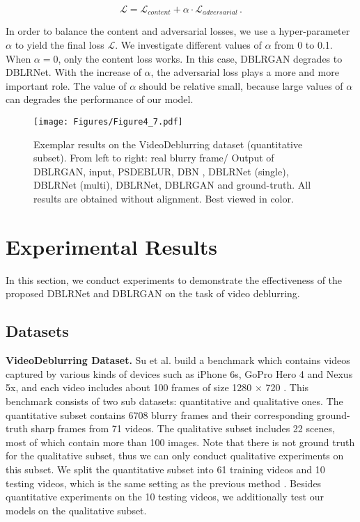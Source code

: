 \documentclass[journal]{IEEEtran}
\begin{document}
\begin{equation}
\mathcal{L} = \mathcal{L}_{content} + \alpha \cdot \mathcal{L}_{adversarial} \, .
\end{equation}

In order to balance the content and adversarial losses, we use a hyper-parameter  $\alpha$ to yield the final loss $\mathcal{L}$. We investigate different values of $\alpha$ from 0 to 0.1. When $\alpha=0$, only the content loss works. In this case, DBLRGAN degrades to DBLRNet. With the increase of $\alpha$, the adversarial loss plays a more and more important role. The value of $\alpha$ should be relative small, because large values of $\alpha$ can degrades the performance of our model.

\begin{figure*}[ht]
	\centering
	\texttt{[image: Figures/Figure4\_7.pdf]}
	\caption{Exemplar results on the VideoDeblurring dataset (quantitative subset). From left to right: real blurry frame/ Output of DBLRGAN, input, PSDEBLUR, DBN \cite{su2016deep}, DBLRNet (single), DBLRNet (multi), DBLRNet, DBLRGAN and ground-truth. All results are obtained without alignment. Best viewed in color.}
	\label{figure4}
\end{figure*}

\section{Experimental Results}
\noindent In this section, we conduct experiments to demonstrate the effectiveness of the proposed DBLRNet and DBLRGAN on the task of video deblurring.

\subsection{Datasets}

\textbf{VideoDeblurring Dataset.} Su et al. build a benchmark which contains videos captured by various kinds of devices such as iPhone 6s, GoPro Hero 4 and Nexus 5x, and each video includes about 100 frames of size 1280 $\times$ 720 \cite{su2016deep}. This benchmark consists of two sub datasets: quantitative and qualitative ones. The quantitative subset contains 6708 blurry frames and their corresponding ground-truth sharp frames from 71 videos. The qualitative subset includes 22 scenes, most of which contain more than 100 images. Note that there is not ground truth for the qualitative subset, thus we can only conduct qualitative experiments on this subset. We split the quantitative subset into 61 training videos and 10 testing videos, which is the same setting as the previous method \cite{su2016deep}. Besides quantitative experiments on the 10 testing videos, we additionally test our models on the qualitative subset.
\end{document}
